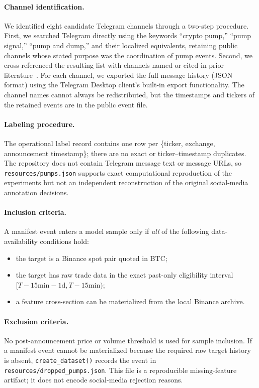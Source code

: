 \documentclass{ieeeaccess}
\begin{document}
\paragraph{Channel identification.}
We identified eight candidate Telegram channels through a two-step procedure. First, we searched Telegram directly using the keywords ``crypto pump,'' ``pump signal,'' ``pump and dump,'' and their localized equivalents, retaining public channels whose stated purpose was the coordination of pump events. Second, we cross-referenced the resulting list with channels named or cited in prior literature~\cite{la_morgia_pump_2020, pd_anatomy, econometrics11030022}. For each channel, we exported the full message history (JSON format) using the Telegram Desktop client's built-in export functionality. The channel names cannot always be redistributed, but the timestamps and tickers of the retained events are in the public event file.

\paragraph{Labeling procedure.}
The operational label record contains one row per \{ticker, exchange, announcement timestamp\}; there are no exact or ticker--timestamp duplicates. The repository does not contain Telegram message text or message URLs, so \texttt{resources/pumps.json} supports exact computational reproduction of the experiments but not an independent reconstruction of the original social-media annotation decisions.

\paragraph{Inclusion criteria.}
A manifest event enters a model sample only if \emph{all} of the following data-availability conditions hold:
\begin{itemize}
    \item the target is a Binance spot pair quoted in BTC;
    \item the target has raw trade data in the exact past-only eligibility interval $[T-15\text{min}-1\text{d},T-15\text{min})$;
    \item a feature cross-section can be materialized from the local Binance archive.
\end{itemize}

\paragraph{Exclusion criteria.}
No post-announcement price or volume threshold is used for sample inclusion. If a manifest event cannot be materialized because the required raw target history is absent, \texttt{create\_dataset()} records the event in \texttt{resources/dropped\_pumps.json}. This file is a reproducible missing-feature artifact; it does not encode social-media rejection reasons.
\end{document}
